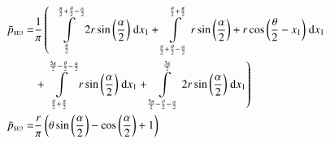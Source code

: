 \begin{align}
    \bar{p}_{\text{\tiny{SE3}}} =&\frac{1}{\pi} \left(\;\;\int\limits_{\frac{\pi}{2}}^{\frac{\pi}{2} + \frac{\theta}{2} - \frac{\alpha}{2}}2 r \sin{\left (\frac{\alpha}{2} \right )}\;\mathrm{d}x_{1}+\int\limits_{\frac{\pi}{2} + \frac{\theta}{2} - \frac{\alpha}{2}}^{\frac{\theta}{2} + \frac{\pi}{2}}r \sin{\left (\frac{\alpha}{2} \right )} + r \cos{\left (\frac{\theta}{2} - x_{1} \right )}\;\mathrm{d}x_{1}\right.\notag\\
 &\left.+\int\limits_{\frac{\theta}{2} + \frac{\pi}{2}}^{\frac{5 \pi}{2} - \frac{\theta}{2} - \frac{\alpha}{2}}r \sin{\left (\frac{\alpha}{2} \right )}\;\mathrm{d}x_{1}+\int\limits_{\frac{5 \pi}{2} - \frac{\theta}{2} - \frac{\alpha}{2}}^{\frac{3 \pi}{2}}2 r \sin{\left (\frac{\alpha}{2} \right )}\;\mathrm{d}x_{1}\right)\label{pSE3Def}\\
    \bar{p}_{\text{\tiny{SE3}}}  =& \frac{r}{\pi} \left(\theta \sin{\left (\frac{\alpha}{2} \right )} - \cos{\left (\frac{\alpha}{2} \right )} + 1\right)\label{pSE3Sln}
\end{align}